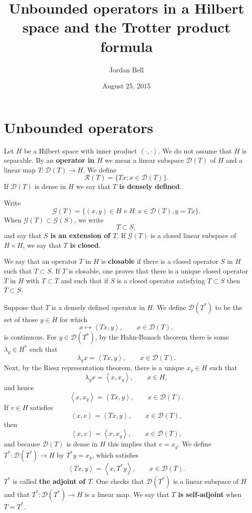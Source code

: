 \documentclass{article}
\newcommand{\inner}[2]{\left\langle #1, #2 \right\rangle}
\theoremstyle{definition}
\begin{document}
\title{Unbounded operators in a Hilbert space and the Trotter product formula}
\author{Jordan Bell}
\date{August 25, 2015}

\maketitle

\section{Unbounded operators}
Let $H$ be a Hilbert space with inner product $\inner{\cdot}{\cdot}$. We do not assume that $H$ is separable.
By an \textbf{operator in $H$} we mean 
a linear subspace
$\mathscr{D}(T)$ of $H$ and a linear map
$T:\mathscr{D}(T) \to H$.
We define
\[
\mathscr{R}(T) = \{Tx: x \in \mathscr{D}(T)\}.
\]
If $\mathscr{D}(T)$ is dense in $H$ we say that \textbf{$T$ is densely defined}.

Write
\[
\mathscr{G}(T) = \{(x,y) \in H \times H: x \in \mathscr{D}(T), y = Tx\}.
\]
When $\mathscr{G}(T) \subset \mathscr{G}(S)$, we write
\[
T \subset S,
\]
and say that \textbf{$S$ is an extension of $T$}.
If $\mathscr{G}(T)$ is a closed linear subspace of $H \times H$, we say that \textbf{$T$ is closed}.

We say that an operator $T$ in $H$ is \textbf{closable} if there is a closed operator $S$ in $H$ such that
$T \subset S$. If $T$ is closable, one proves that there is a unique closed operator $\overline{T}$ in $H$ with
$T \subset \overline{T}$ and such that if $S$ is a closed operator satisfying $T \subset S$ then
$\overline{T} \subset S$. 

Suppose that $T$ is a densely defined operator in $H$. We define $\mathscr{D}(T^*)$ to be
the set of those $y \in H$ for which 
\[
x \mapsto \inner{Tx}{y}, \qquad x \in \mathscr{D}(T),
\]
is continuous. For $y \in \mathscr{D}(T^*)$, by the Hahn-Banach theorem there is some $\lambda_y
\in H^*$ such that
\[
\lambda_y x = \inner{Tx}{y}, \qquad x \in \mathscr{D}(T).
\]
Next, by the Riesz representation theorem, there is a unique 
$x_y \in H$ such that
\[
\lambda_y x = \inner{x}{x_y}, \qquad x \in H,
\]
and hence
\[
\inner{x}{x_y} = \inner{Tx}{y}, \qquad x \in \mathscr{D}(T).
\]
If $v \in H$ satisfies
\[
\inner{x}{v} = \inner{Tx}{y}, \qquad x \in \mathscr{D}(T),
\]
then 
\[
\inner{x}{v} = \inner{x}{x_y}, \qquad x \in \mathscr{D}(T),
\]
and because $\mathscr{D}(T)$ is dense in $H$ this implies that $v=x_y$.
We define
$T^*:\mathscr{D}(T^*) \to H$ by $T^*y = x_y$, which satisfies
\[
\inner{Tx}{y} = \inner{x}{T^*y}, \qquad x \in \mathscr{D}(T).
\]
$T^*$ is called \textbf{the adjoint of $T$}.
One checks that $\mathscr{D}(T^*)$ is a linear subspace of $H$ and that
$T^*:\mathscr{D}(T^*) \to H$ is a linear map.
We say that \textbf{$T$ is self-adjoint} when $T=T^*$.
\end{document}

